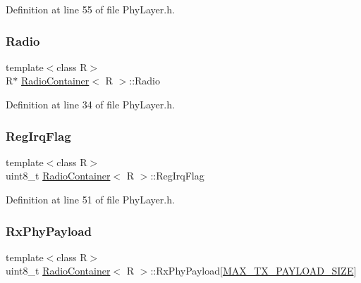 Definition at line 55 of file Phy\+Layer.\+h.

\mbox{\label{class_radio_container_a30b5b1397632040096b08e56e2ec1d47}} 
\subsubsection{\texorpdfstring{Radio}{Radio}}
{\footnotesize\ttfamily template$<$class R$>$ \\
R$\ast$ \mbox{\hyperlink{class_radio_container}{Radio\+Container}}$<$ R $>$\+::Radio}



Definition at line 34 of file Phy\+Layer.\+h.

\mbox{\label{class_radio_container_adbb1e0ef33a7fdeeb2e27b54a4808220}} 
\subsubsection{\texorpdfstring{Reg\+Irq\+Flag}{RegIrqFlag}}
{\footnotesize\ttfamily template$<$class R$>$ \\
uint8\+\_\+t \mbox{\hyperlink{class_radio_container}{Radio\+Container}}$<$ R $>$\+::Reg\+Irq\+Flag}



Definition at line 51 of file Phy\+Layer.\+h.

\mbox{\label{class_radio_container_a100c2c3e3d71652fca93d8ee0a5ecc9c}} 
\subsubsection{\texorpdfstring{Rx\+Phy\+Payload}{RxPhyPayload}}
{\footnotesize\ttfamily template$<$class R$>$ \\
uint8\+\_\+t \mbox{\hyperlink{class_radio_container}{Radio\+Container}}$<$ R $>$\+::Rx\+Phy\+Payload\mbox{[}\mbox{\hyperlink{_define_8h_ade046d6a940b0e4d9f3ae9415066ee6f}{M\+A\+X\+\_\+\+T\+X\+\_\+\+P\+A\+Y\+L\+O\+A\+D\+\_\+\+S\+I\+ZE}}\mbox{]}}



